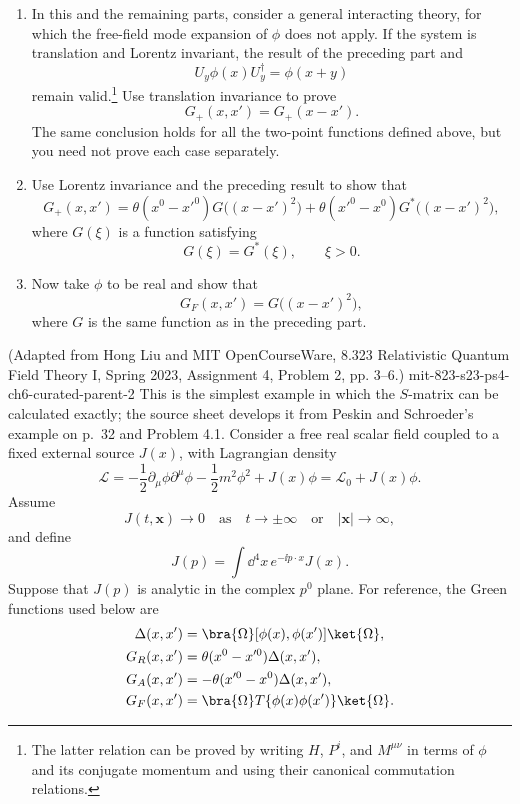 \begin{enumerate}
\begin{enumerate}
\item In this and the remaining parts, consider a general interacting theory,
for which the free-field mode expansion of \(\phi\) does not apply.  If the
system is translation and Lorentz invariant, the result of the preceding part
and
\[
 U_y\phi(x)U_y^\dagger=\phi(x+y)
\]
remain valid.\footnote{The latter relation can be proved by writing
\(H\), \(P^i\), and \(M^{\mu\nu}\) in terms of \(\phi\) and its conjugate
momentum and using their canonical commutation relations.}  Use translation
invariance to prove
\[
 G_+(x,x')=G_+(x-x').
\]
The same conclusion holds for all the two-point functions defined above, but
you need not prove each case separately.

\item Use Lorentz invariance and the preceding result to show that
\[
 G_+(x,x')=
 \theta(x^0-x'^0)G\bigl((x-x')^2\bigr)
 +\theta(x'^0-x^0)G^*\bigl((x-x')^2\bigr),
\]
where \(G(\xi)\) is a function satisfying
\[
 G(\xi)=G^*(\xi),\qquad \xi>0.
\]

\item Now take \(\phi\) to be real and show that
\[
 G_F(x,x')=G\bigl((x-x')^2\bigr),
\]
where \(G\) is the same function as in the preceding part.
\end{enumerate}

  {(Adapted from Hong Liu and MIT OpenCourseWare, 8.323 Relativistic Quantum
  Field Theory I, Spring 2023, Assignment 4, Problem 2, pp. 3--6.)}
  {mit-823-s23-ps4-ch6-curated-parent-2}
This is the simplest example in which the \(S\)-matrix can be calculated
exactly; the source sheet develops it from Peskin and Schroeder's example on
p.~32 and Problem 4.1.  Consider a free real scalar field coupled to a fixed
external source \(J(x)\), with Lagrangian density
\[
 \mathcal L=-\frac12\partial_\mu\phi\partial^\mu\phi
 -\frac12m^2\phi^2+J(x)\phi
 =\mathcal L_0+J(x)\phi.
\]
Assume
\[
 J(t,\mathbf x)\longrightarrow0
 \quad\text{as}\quad t\longrightarrow\pm\infty
 \quad\text{or}\quad |\mathbf x|\longrightarrow\infty,
\]
and define
\[
 J(p)=\int \dd^4x\,e^{-\ii p\cdot x}J(x).
\]
Suppose that \(J(p)\) is analytic in the complex \(p^0\) plane.
For reference, the Green functions used below are
\[
 \begin{split}
 \Delta(x,x')&=\bra{\Omega}[\phi(x),\phi(x')]\ket{\Omega},\\
 G_R(x,x')&=\theta(x^0-x'^0)\Delta(x,x'),\\
 G_A(x,x')&=-\theta(x'^0-x^0)\Delta(x,x'),\\
 G_F(x,x')&=\bra{\Omega}T\{\phi(x)\phi(x')\}\ket{\Omega}.
 \end{split}
\]


\end{enumerate}
